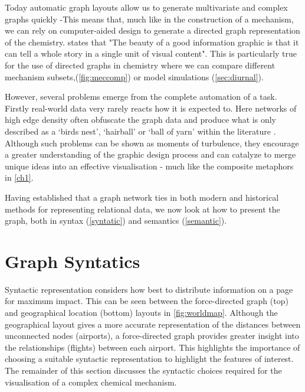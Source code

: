 Today automatic graph layouts allow us to generate multivariate and complex graphs quickly \citep{ch3} -This means that, much like in the construction of a mechanism, we can rely on computer-aided design to generate a directed graph representation of the chemistry. \cite{sciamerican} states that "The beauty of a good information graphic is that it can tell a whole story in a single unit of visual content". This is particularly true for the use of directed graphs in chemistry where we can compare different mechanism subsets,(\autoref{fig:meccomp}) or model simulations (\autoref{sec:diurnal}).

However, several problems emerge from the complete automation of a task. Firstly real-world data very rarely reacts how it is expected to. Here networks of high edge density often obfuscate the graph data and produce what is only described as a `birds nest', `hairball' or `ball of yarn' within the literature \citep{ch7}. Although such problems can be shown as moments of turbulence, they encourage a greater understanding of the graphic design process and can catalyze to merge unique ideas into an effective visualisation \citep{goodideas} - much like the composite metaphors in \autoref{ch1}.


Having established that a graph network ties in both modern and historical methods for representing relational data, we now look at how to present the graph, both in syntax (\autoref{syntatic}) and semantics (\autoref{semantic}). 



\section{Graph Syntatics}\label{syntatic}

 Syntactic representation considers how best to distribute information on a page for maximum impact. This can be seen between the force-directed graph (top) and geographical location (bottom) layouts in \autoref{fig:worldmap}. Although the geographical layout gives a more accurate representation of the distances between unconnected nodes (airports), a force-directed graph provides greater insight into the relationships (flights) between each airport. This highlights the importance of choosing a suitable syntactic representation to highlight the features of interest. The remainder of this section discusses the syntactic choices required for the visualisation of a complex chemical mechanism. 

